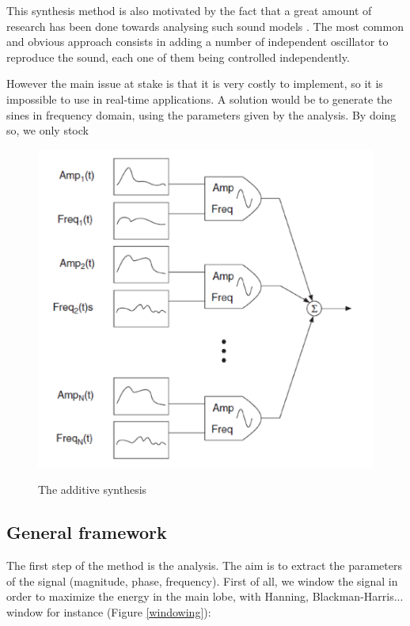 \documentclass[]{article}
\begin{document}
This synthesis method is also motivated by the fact that a great amount of research has been done towards analysing such sound models \cite{rodet1992spectral, depalle1993tracking}. The most common and obvious approach consists in adding a number of independent oscillator to reproduce the sound, each one of them being controlled independently.

However the main issue at stake is that it is very costly to implement, so it is impossible to use in real-time applications. A solution would be to generate the sines in frequency domain, using the parameters given by the analysis. By doing so, we only stock 


\begin{figure}[H]
	\centering
	{\includegraphics[scale=0.4]{additif.png}}
	\caption{ The additive synthesis}
\end{figure} 
\medskip

\subsection{General framework}\label{sec:general-framework}

The first step of the method is the analysis. The aim is to extract the parameters of the signal (magnitude, phase, frequency).
First of all, we window the signal in order to maximize the energy in the main lobe, with Hanning, Blackman-Harris... window for instance (Figure \ref{windowing}):
\end{document}
